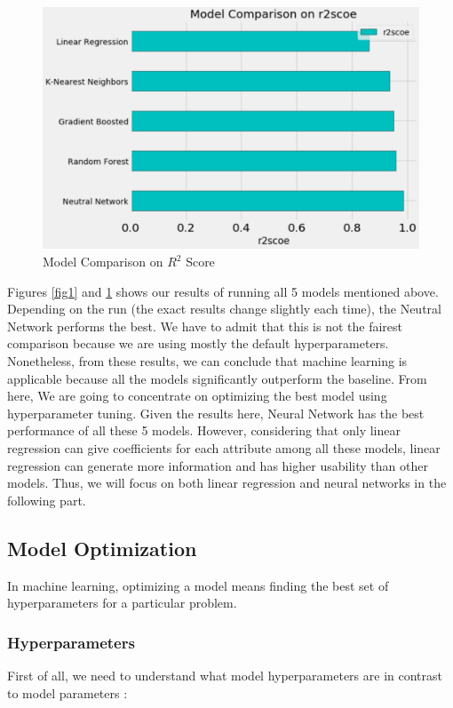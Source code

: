 \documentclass{article}
\begin{document}
\begin{figure}[!htb]
	\centering
    \includegraphics[scale=0.35]{r2score.png}
    \caption{Model Comparison on $R^2$ Score}\label{fig2}
\end{figure}

Figures \ref{fig1} and \ref{fig2} shows our results of running all 5 models mentioned above. Depending on the run (the exact results change slightly each time), the Neutral Network performs the best. We have to admit that this is not the fairest comparison because we are using mostly the default hyperparameters. Nonetheless, from these results, we can conclude that machine learning is applicable because all the models significantly outperform the baseline.
From here, We are going to concentrate on optimizing the best model using hyperparameter tuning. Given the results here, Neural Network has the best performance of all these 5 models. However, considering that only linear regression can give coefficients for each attribute among all these models, linear regression can generate more information and has higher usability than other models. Thus, we will focus on both linear regression and neural networks in the following part.


\subsection*{Model Optimization}
In machine learning, optimizing a model means finding the best set of hyperparameters for a particular problem.

\subsubsection*{Hyperparameters}
First of all, we need to understand what model hyperparameters are in contrast to model parameters :
\end{document}
